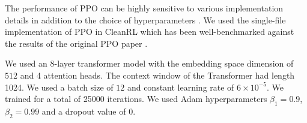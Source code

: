 The performance of PPO can be highly sensitive to various implementation details in addition to the choice of hyperparameters \cite{shengyi2022the37implementation, engstrom2020implementation}. We used the single-file implementation of PPO in CleanRL \cite{huang2022cleanrl} which has been well-benchmarked against the results of the original PPO paper \cite{schulman2017proximal}.





We used an 8-layer transformer model with the embedding space dimension of $512$ and 4 attention heads. The context window of the Transformer had length 1024. We used a batch size of $12$ and constant learning rate of $6 \times 10^{-5}$. We trained for a total of 25000 iterations. We used Adam hyperparameters $\beta_1 = 0.9$, $\beta_2 = 0.99$ and a dropout value of $0$.